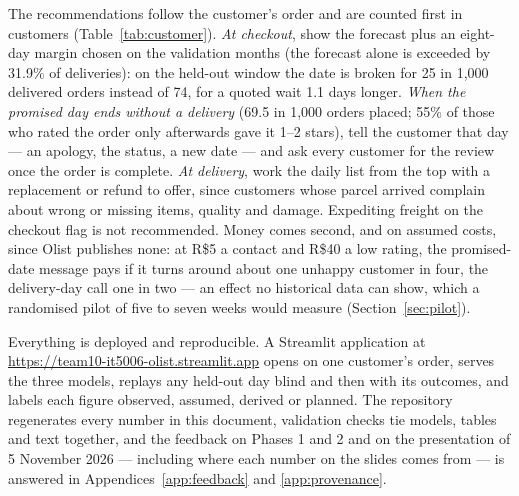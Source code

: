 The recommendations follow the customer's order and are counted first in
customers (Table~\ref{tab:customer}). \emph{At checkout}, show the
forecast plus an eight-day margin chosen on the validation months (the forecast
alone is exceeded by 31.9\% of deliveries): on the held-out window
the date is broken for 25 in 1{,}000 delivered orders instead of 74, for a
quoted wait 1.1 days longer. \emph{When the promised day ends without a
delivery} (69.5 in 1{,}000 orders placed; 55\% of those who rated the order only
afterwards gave it 1--2 stars), tell the customer that day --- an apology, the
status, a new date --- and ask every customer for the review once the order is
complete. \emph{At delivery}, work the daily list from the top
with a replacement or refund to offer, since customers whose parcel arrived
complain about wrong or missing items, quality and damage. Expediting freight on
the checkout flag is not recommended. Money comes second, and on assumed costs,
since Olist publishes none: at R\$5 a contact and R\$40 a low rating, the
promised-date message pays if it turns around about one unhappy customer in
four, the delivery-day call one in two --- an effect no historical data can
show, which a randomised pilot of five to seven weeks would measure
(Section~\ref{sec:pilot}).

Everything is deployed and reproducible. A Streamlit application at
\url{https://team10-it5006-olist.streamlit.app} opens on one customer's order,
serves the three models, replays any held-out day blind and then with its
outcomes, and labels each figure observed, assumed, derived or planned. The repository
regenerates every number in this document, \checkcount{} validation checks tie
models, tables and text together, and the feedback on Phases 1 and 2 and on the
presentation of 5 November 2026 --- including where each number on the slides
comes from --- is answered in Appendices~\ref{app:feedback} and
\ref{app:provenance}.
